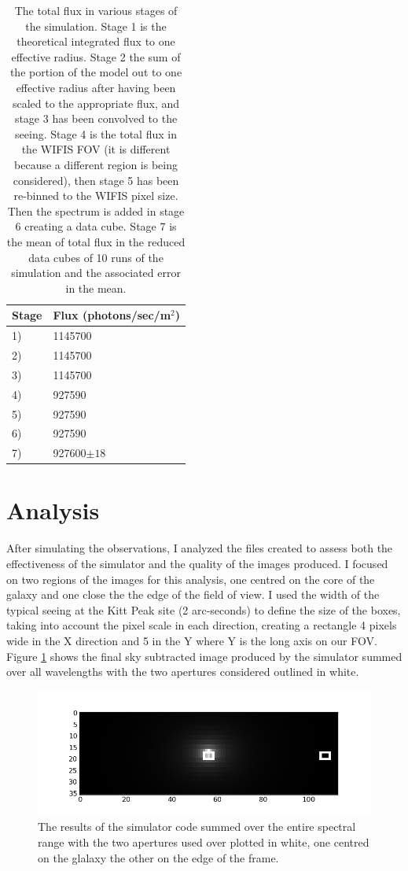 \documentclass[11pt,twoside]{article}
\begin{document}
\begin{table}[htbp]
\centering
\caption{The total flux in various stages of the simulation. Stage 1 is the theoretical integrated flux to one effective radius. Stage 2 the sum of the portion of the model out to one effective radius after having been scaled to the appropriate flux, and stage 3 has been convolved to the seeing. Stage 4 is the total flux in the WIFIS FOV (it is different because a different region is being considered), then stage 5 has been re-binned to the WIFIS pixel size. Then the spectrum is added in stage 6 creating a data cube. Stage 7 is the mean of total flux in the reduced data cubes of 10 runs of the simulation and the associated error in the mean.}
\label{flux}
\begin{tabular}{|l|l|}
\hline
\bf{Stage}&\bf{Flux (photons/sec/m$^2$)}\\ \hline
1)&1145700\\
2)&1145700\\
3)&1145700\\
4)&927590\\
5)&927590\\
6)&927590\\
7)&927600$\pm18$\\

\hline
\end{tabular}
\end{table}



\section{Analysis}
After simulating the observations, I analyzed the files created to assess both the effectiveness of the simulator and the quality of the images produced. I focused on two regions of the images for this analysis, one centred on the core of the galaxy and one close the the edge of the field of view. I used the width of the typical seeing at the Kitt Peak site (2 arc-seconds) to define the size of the boxes, taking into account the pixel scale in each direction, creating a rectangle 4 pixels wide in the X direction and 5 in the Y where Y is the long axis on our FOV. Figure \ref{final} shows the final sky subtracted image produced by the simulator summed over all wavelengths with the two apertures considered outlined in white.

\begin{figure}
\centering
\includegraphics[width=\textwidth]{final_img}
\caption{The results of the simulator code summed over the entire spectral range with the two apertures used over plotted in white, one centred on the glalaxy the other on the edge of the frame.}
\label{final}
\end{figure}
\end{document}
